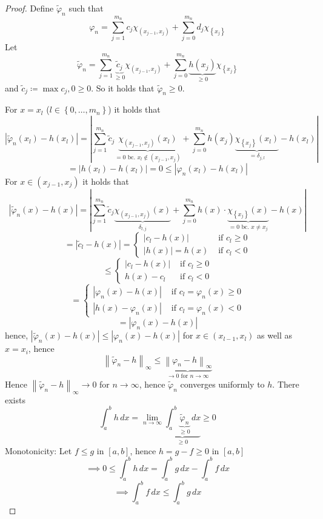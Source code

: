 \documentclass{article}
\newcommand{\set}[1]{\left\{#1\right\}}
\newcommand{\norm}[1]{\left\|#1\right\|}
\newcommand{\card}[1]{\left|#1\right|}
\begin{document}
\begin{proof}
  Define $\tilde\varphi_n$ such that
  \[ \varphi_n = \sum_{j=1}^{m_n} c_j \chi_{(x_{j-1}, x_j)} + \sum_{j=0}^{m_n} d_j \chi_{\set{x_j}} \]
  Let
  \[ \tilde\varphi_n = \sum_{j=1}^{m_n} \underbrace{\tilde c_{j}}_{\geq 0} \chi_{(x_{j-1}, x_j)} + \sum_{j=0}^{m_n} \underbrace{h(x_j)}_{\geq 0} \chi_{\set{x_j}} \]
  and $\tilde c_j \coloneqq \max{c_j, 0} \geq 0$.
  So it holds that $\tilde \varphi_n \geq 0$.

  For $x = x_l$ ($l \in \set{0, \dots, m_n}$) it holds that
  \[
    \card{\tilde \varphi_n(x_l) - h(x_l)}
      = \card{\sum_{j=1}^{m_n} \tilde c_j \underbrace{\chi_{(x_{j-1}, x_j)}(x_l)}_{=0 \text{ bc. } x_l \not\in (x_{j-1}, x_j)} + \sum_{j=0}^{m_n} h(x_j) \underbrace{\chi_{\set{x_j}}(x_l)}_{= \delta_{j,l}} - h(x_l)}
  \] \[
    = \card{h(x_l) - h(x_l)} = 0 \leq \card{\varphi_n(x_l) - h(x_l)}
  \]
  For $x \in (x_{j-1}, x_j)$ it holds that
  \[
    \card{\tilde\varphi_n(x) - h(x)}
      = \card{\sum_{j=1}^{m_n} \tilde c_j \underbrace{\chi_{(x_{j-1}, x_j)}(x)}_{\delta_{l,j}} + \sum_{j=0}^{m_n} h(x) \cdot \underbrace{\chi_{\set{x_j}}(x)}_{=0 \text{ bc. } x \neq x_j} - h(x)}
  \] \[
    = \card{\tilde c_l - h(x)}
    = \begin{cases}
      \card{c_l - h(x)} & \text{ if } c_l \geq 0 \\
      \card{h(x)} = h(x) & \text{ if } c_l < 0
    \end{cases}
  \] \[
    \leq \begin{cases}
      \card{c_l - h(x)} & \text{ if } c_l \geq 0 \\
      h(x) - c_l & \text{ if } c_l < 0
    \end{cases}
  \] \[
    = \begin{cases}
      \card{\varphi_n(x) - h(x)} & \text{ if } c_l = \varphi_n(x) \geq 0 \\
      \card{h(x) - \varphi_n(x)} & \text{ if } c_l = \varphi_n(x) < 0
    \end{cases}
  \] \[
    = \card{\varphi_n(x) - h(x)}
  \]
  hence, $\card{\tilde\varphi_n(x) - h(x)} \leq \card{\varphi_n(x) - h(x)}$
  for $x \in (x_{l-1}, x_l)$ as well as $x = x_i$,
  hence
  \[ \norm{\tilde\varphi_n - h}_{\infty} \leq \underbrace{\norm{\varphi_n - h}_{\infty}}_{\to 0 \text{ for } n \to \infty} \]
  Hence $\norm{\tilde\varphi_n - h}_{\infty} \to 0$ for $n \to \infty$, hence $\tilde\varphi_n$ converges uniformly to $h$.
  There exists
  \[ \int_a^b h \, dx = \lim_{n\to\infty} \underbrace{\int_a^b \underbrace{\tilde\varphi_n}_{\geq 0} \, dx}_{\geq 0} \geq 0 \]
  Monotonicity: Let $f \leq g$ in $[a,b]$, hence $h = g - f \geq 0$ in $[a,b]$
  \[ \implies 0 \leq \int_a^b h \, dx = \int_a^b g \, dx - \int_a^b f \, dx \]
  \[ \implies \int_a^b f \, dx \leq \int_a^b g \, dx \]


\end{proof}
\end{document}
